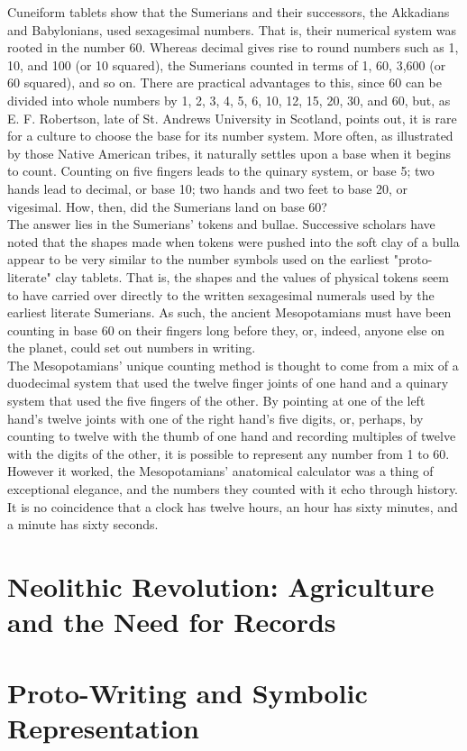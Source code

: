 Cuneiform tablets show that the Sumerians and their successors, the Akkadians and Babylonians, used sexagesimal numbers. That is, their numerical system was rooted in the number 60. Whereas decimal gives rise to round numbers such as 1, 10, and 100 (or 10 squared), the Sumerians counted in terms of 1, 60, 3,600 (or 60 squared), and so on. There are practical advantages to this, since 60 can be divided into whole numbers by 1, 2, 3, 4, 5, 6, 10, 12, 15, 20, 30, and 60, but, as E. F. Robertson, late of St. Andrews University in Scotland, points out, it is rare for a culture to choose the base for its number system. More often, as illustrated by those Native American tribes, it naturally settles upon a base when it begins to count. Counting on five fingers leads to the quinary system, or base 5; two hands lead to decimal, or base 10; two hands and two feet to base 20, or vigesimal. How, then, did the Sumerians land on base 60?\\
The answer lies in the Sumerians' tokens and bullae. Successive scholars have noted that the shapes made when tokens were pushed into the soft clay of a bulla appear to be very similar to the number symbols used on the earliest "proto-literate" clay tablets. That is, the shapes and the values of physical tokens seem to have carried over directly to the written sexagesimal numerals used by the earliest literate Sumerians. As such, the ancient Mesopotamians must have been counting in base 60 on their fingers long before they, or, indeed, anyone else on the planet, could set out numbers in writing.\\
The Mesopotamians' unique counting method is thought to come from a mix of a duodecimal system that used the twelve finger joints of one hand and a quinary system that used the five fingers of the other. By pointing at one of the left hand’s twelve joints with one of the right hand’s five digits, or, perhaps, by counting to twelve with the thumb of one hand and recording multiples of twelve with the digits of the other, it is possible to represent any number from 1 to 60. However it worked, the Mesopotamians’ anatomical calculator was a thing of exceptional elegance, and the numbers they counted with it echo through history. It is no coincidence that a clock has twelve hours, an hour has sixty minutes, and a minute has sixty seconds.\cite{houston2023_earlyhistory}
\newpage

\section{Neolithic Revolution: Agriculture and the Need for Records}

\section{Proto-Writing and Symbolic Representation}
